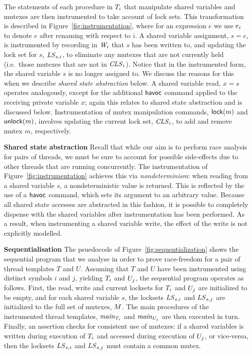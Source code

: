 The statements of each procedure in $T_{i}$ that manipulate shared variables and mutexes are then instrumented to take account of lock sets.  This transformation is described in Figure~\ref{fig:instrumentation}, where for an expression $e$ we use $e_{i}$ to denote $e$ after renaming with respect to $i$.  A shared variable assignment, $s = e$, is instrumented by recording in $\mathit{W}_{i}$ that $s$ has been written to, and updating the lock set for $s$, $\mathit{LS}_{s,i}$, to eliminate any mutexes that are not currently held (i.e.\ those mutexes that are not in $\mathit{CLS}_{i}$).  Notice that in the instrumented form, the shared variable $s$ is no longer assigned to.  We discuss the reasons for this when we describe \emph{shared state abstraction} below.  A shared variable read, $x = s$ operates analogously, except for the additional $\mathsf{havoc}$ command applied to the receiving private variable $x$; again this relates to shared state abstraction and is discussed below.  Instrumentation of mutex manipulation commands, $\mathsf{lock}(m)$ and $\mathsf{unlock}(m)$, involves updating the current lock set, $\mathit{CLS}_{i}$, to add and remove mutex $m$, respectively.

\medskip\noindent\textbf{Shared state abstraction }
Recall that while our aim is to perform race analysis for pairs of threads, we must be sure to account
for possible side-effects due to other threads that are running concurrently.  The instrumentation
of Figure~\ref{fig:instrumentation} achieves this via \emph{nondeterminism}: when reading from a shared variable $s$,
a nondeterministic value is returned.  This is reflected by the use of a $\mathsf{havoc}$ command,
which sets its argument to an arbitrary value.  Because all shared state accesses are abstracted in
this fashion, it is possible to completely dispense with the shared variables after instrumentation
has been performed.  As a result, when instrumenting a shared variable write, the effect of the write
is not explicitly modelled.

\medskip\noindent\textbf{Sequentialisation }
The psuedocode of Figure~\ref{fig:sequentialization} shows the sequential program that we
analyse in order to prove race-freedom for a pair of thread templates $T$ and $U$.
Assuming that $T$ and $U$ have been instrumented using distinct symbols $i$ and $j$, yielding
$T_{i}$ and $U_{j}$, the sequential program operates as follows.
First, the read, write and current locksets for $T_{i}$ and $U_{j}$ are
initialized to be empty, and for each shared variable $s$, the locksets $\mathit{LS}_{s,i}$ and
$\mathit{LS}_{s,j}$ are initialized to the full set of mutexes, $M$.  The main procedures
of the instrumented thread templates, $\mathit{main}_{T_{i}}$ and
$\mathit{main}_{U_{j}}$ are then executed in turn.  Finally, an assertion checks
for consistent use of mutexes: if a shared variables is written during execution of $T_{i}$
and accessed during execution of $U_{j}$, or vice-versa, then the locksets $\mathit{LS}_{s,i}$
and $\mathit{LS}_{s,j}$ must contain a common mutex.

